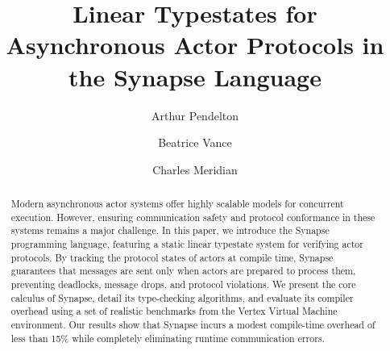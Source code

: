 \documentclass[acmsmall,screen,review,anonymous]{acmart}
\begin{document}
\title{Linear Typestates for Asynchronous Actor Protocols in the Synapse Language}

\author{Arthur Pendelton}

\author{Beatrice Vance}

\author{Charles Meridian}

\renewcommand{\shortauthors}{Pendelton et al.}

\begin{abstract}
Modern asynchronous actor systems offer highly scalable models for concurrent execution.
However, ensuring communication safety and protocol conformance in these systems remains a
major challenge. In this paper, we introduce the Synapse programming language, featuring a
static linear typestate system for verifying actor protocols. By tracking the protocol
states of actors at compile time, Synapse guarantees that messages are sent only when actors
are prepared to process them, preventing deadlocks, message drops, and protocol violations.
We present the core calculus of Synapse, detail its type-checking algorithms, and evaluate
its compiler overhead using a set of realistic benchmarks from the Vertex Virtual Machine
environment. Our results show that Synapse incurs a modest compile-time overhead of less
than 15\% while completely eliminating runtime communication errors.
\end{abstract}



\maketitle

\noindent{}











\end{document}
